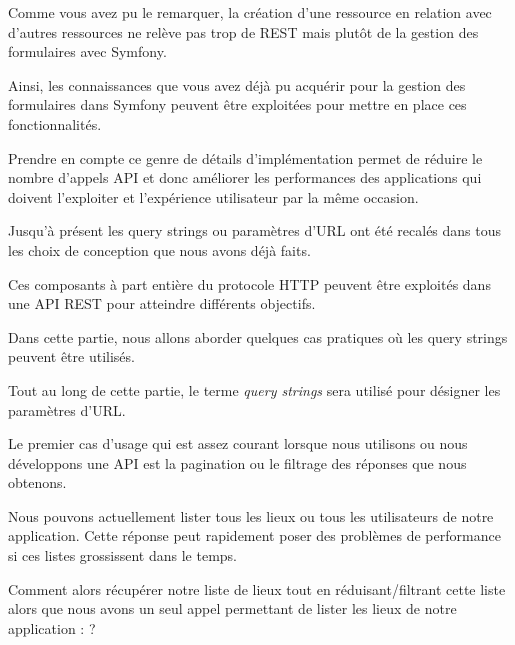 \documentclass[big]{zmdocument}
\begin{document}
\horizontalLine



Comme vous avez pu le remarquer, la création d'une ressource en relation avec d'autres ressources ne relève pas trop de REST mais plutôt de la gestion des formulaires avec Symfony.



Ainsi, les connaissances que vous avez déjà pu acquérir pour la gestion des formulaires dans Symfony peuvent être exploitées pour mettre en place ces fonctionnalités.



Prendre en compte ce genre de détails d'implémentation permet de réduire le nombre d'appels API et donc améliorer les performances des applications qui doivent l'exploiter et l'expérience utilisateur par la même occasion.





Jusqu'à présent les query strings ou paramètres d'URL ont été recalés dans tous les choix de conception que nous avons déjà faits.



Ces composants à part entière du protocole HTTP peuvent être exploités dans une API REST pour atteindre différents objectifs.



Dans cette partie, nous allons aborder quelques cas pratiques où les query strings peuvent être utilisés.



Tout au long de cette partie, le terme \textit{query strings} sera utilisé pour désigner les paramètres d'URL.





Le premier cas d'usage qui est assez courant lorsque nous utilisons ou nous développons une API est la pagination ou le filtrage des réponses que nous obtenons.



Nous pouvons actuellement lister tous les lieux ou tous les utilisateurs de notre application. Cette réponse peut rapidement poser des problèmes de performance si ces listes grossissent dans le temps.



\begin{Question}
Comment alors récupérer notre liste de lieux tout en réduisant/filtrant cette liste alors que nous avons un seul appel permettant de lister les lieux de notre application :  ?
\end{Question}
\end{document}
